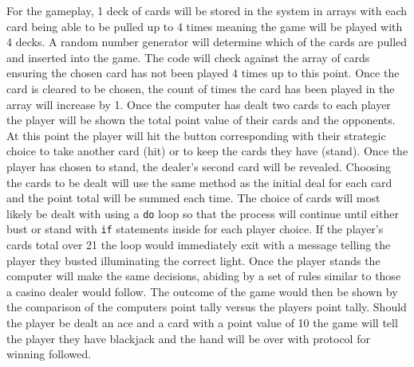\documentclass[12pt]{article}
\begin{document}


For the gameplay, 1 deck of cards will be stored in the system in arrays with each card being able to be pulled up to 4 times meaning the game will be played with 4 decks. A random number generator will determine which of the cards are pulled and inserted into the game. The code will check against the array of cards ensuring the chosen card has not been played 4 times up to this point. Once the card is cleared to be chosen, the count of times the card has been played in the array will increase by 1. Once the computer has dealt two cards to each player the player will be shown the total point value of their cards and the opponents. At this point the player will hit the button corresponding with their strategic choice to take another card (hit) or to keep the cards they have (stand). Once the player has chosen to stand, the dealer’s second card will be revealed. Choosing the cards to be dealt will use the same method as the initial deal for each card and the point total will be summed each time. The choice of cards will most likely be dealt with using a \texttt{do} loop so that the process will continue until either bust or stand with \texttt{if} statements inside for each player choice. If the player’s cards total over 21 the loop would immediately exit with a message telling the player they busted illuminating the correct light. Once the player stands the computer will make the same decisions, abiding by a set of rules similar to those a casino dealer would follow. The outcome of the game would then be shown by the comparison of the computers point tally versus the players point tally. Should the player be dealt an ace and a card with a point value of 10 the game will tell the player they have blackjack and the hand will be over with protocol for winning followed.
\end{document}
